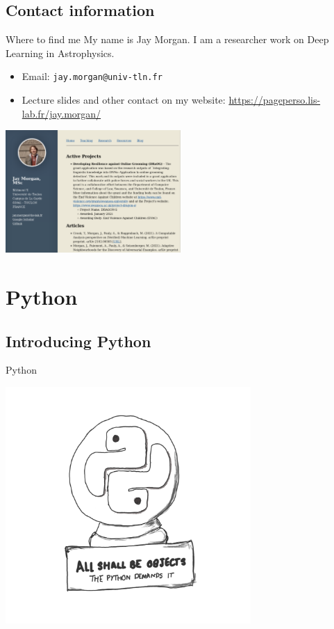 \documentclass[10pt]{beamer}
\begin{document}
\subsection{Contact information}
\label{sec:orgd50e207}

\begin{frame}[label={sec:org376d82a},fragile]{Where to find me}
 My name is Jay Morgan. I am a researcher work on Deep Learning in Astrophysics.

\begin{itemize}
\item Email: \texttt{jay.morgan@univ-tln.fr}
\item Lecture slides and other contact on my website: \url{https://pageperso.lis-lab.fr/jay.morgan/}
\end{itemize}

\begin{center}
\includegraphics[width=0.5\textwidth]{./images/website.png}
\end{center}
\end{frame}

\section{Python}
\label{sec:org3b70f2d}

\subsection{Introducing Python}
\label{sec:org81433b5}

\begin{frame}[label={sec:orgac66f1c}]{Python}
\begin{center}
\includegraphics[width=0.7\textwidth]{./images/python-objects.png}
\end{center}
\end{frame}
\end{document}
